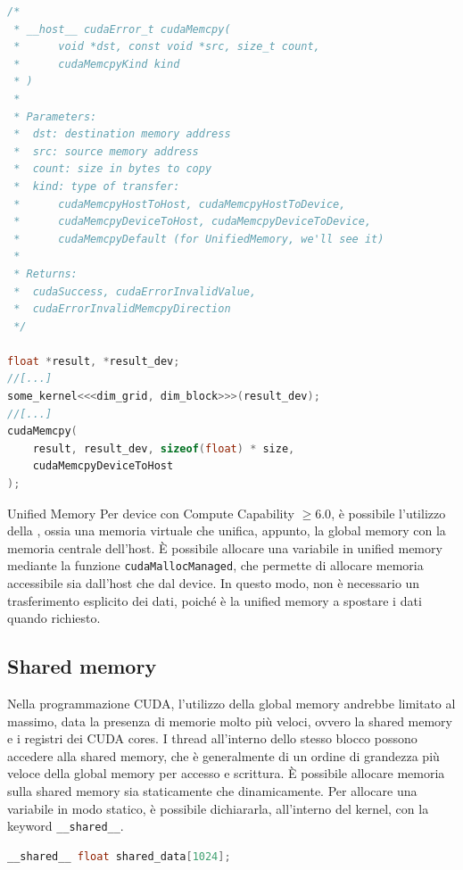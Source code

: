 \begin{lstlisting}[language=C++, numbers=none]
/*
 * __host__ cudaError_t cudaMemcpy(
 *      void *dst, const void *src, size_t count,
 *      cudaMemcpyKind kind
 * )
 * 
 * Parameters:
 *  dst: destination memory address
 *  src: source memory address
 *  count: size in bytes to copy
 *  kind: type of transfer:
 *      cudaMemcpyHostToHost, cudaMemcpyHostToDevice,
 *      cudaMemcpyDeviceToHost, cudaMemcpyDeviceToDevice,
 *      cudaMemcpyDefault (for UnifiedMemory, we'll see it)
 *
 * Returns:
 *  cudaSuccess, cudaErrorInvalidValue,
 *  cudaErrorInvalidMemcpyDirection
 */

float *result, *result_dev;
//[...]
some_kernel<<<dim_grid, dim_block>>>(result_dev);
//[...]
cudaMemcpy(
    result, result_dev, sizeof(float) * size,
    cudaMemcpyDeviceToHost
);
\end{lstlisting}

\begin{observation}{Unified Memory}
Per device con Compute Capability \(\geq 6.0\), è possibile l'utilizzo della , ossia una memoria virtuale che unifica, appunto, la global memory con la memoria centrale dell'host.
È possibile allocare una variabile in unified memory mediante la funzione \texttt{cudaMallocManaged}, che permette di allocare memoria accessibile sia dall'host che dal device.
In questo modo, non è necessario un trasferimento esplicito dei dati, poiché è la unified memory a spostare i dati quando richiesto.
\end{observation}

\subsection{Shared memory}
Nella programmazione CUDA, l'utilizzo della global memory andrebbe limitato al massimo, data la presenza di memorie molto più veloci, ovvero la shared memory e i registri dei CUDA cores.
I thread all'interno dello stesso blocco possono accedere alla shared memory, che è generalmente di un ordine di grandezza più veloce della global memory per accesso e scrittura.
È possibile allocare memoria sulla shared memory sia staticamente che dinamicamente.
Per allocare una variabile in modo statico, è possibile dichiararla, all'interno del kernel, con la keyword \texttt{\_\_shared\_\_}.

\begin{lstlisting}[language=C++, numbers=none]
__shared__ float shared_data[1024];
\end{lstlisting}

